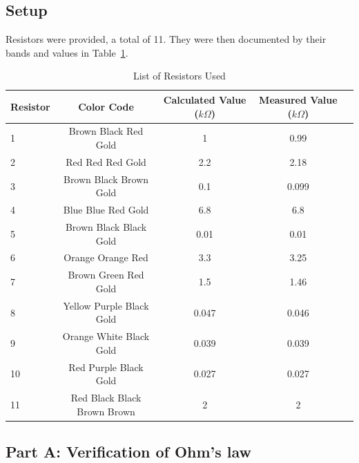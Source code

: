 \documentclass{article}
\begin{document}
\subsection{Setup}
\label{sub:Setup}
Resistors were provided, a total of 11. They were then documented by
their bands and values in Table~\ref{tab:resultResistors}.
    \begin{table}[!ht]
  \captionsetup{font=large}
  \centering
  \caption{ List of Resistors Used }
  \label{tab:resultResistors}
  \begin{tabular}{   | l | c | c | c | r | }
  \hline

      Resistor &     Color Code &     Calculated Value ($ k \Omega $) &     Measured Value ($ k \Omega $)     \\ \hline
      1 &    Brown Black Red Gold &     1 &     0.99     \\ \hline
      2 &    Red Red Red Gold &     2.2 &     2.18     \\ \hline
      3 &    Brown Black Brown Gold &     0.1 &     0.099     \\ \hline
      4 &    Blue Blue Red Gold &     6.8 &    6.8     \\ \hline
      5 &    Brown Black Black Gold &     0.01 &     0.01     \\ \hline
      6 &    Orange Orange Red &     3.3 &    3.25     \\ \hline
      7 &    Brown Green Red Gold &     1.5 &    1.46     \\ \hline
      8 &    Yellow Purple Black Gold &     0.047 &     0.046     \\ \hline
      9 &    Orange White Black Gold &     0.039 &     0.039     \\ \hline
      10 &    Red Purple Black Gold &     0.027 &     0.027     \\ \hline
      11 &    Red Black Black Brown Brown &     2 &     2      \\ \hline
  
  \end{tabular}
  \end{table}




\subsection{Part A: Verification of Ohm’s law}
\label{sub:Part A}
      
\end{document}
